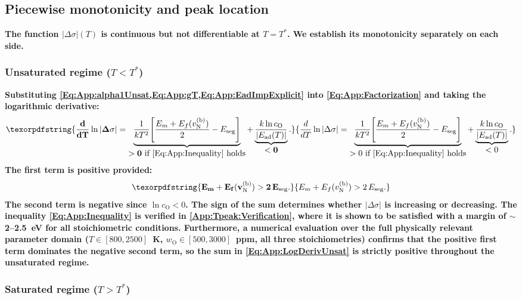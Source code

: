 \documentclass[preprint,12pt,sort&compress]{elsarticle}
\newcommand{\?}{\stackrel{?}{=}}
\providecommand{\DIFaddtex}[1]{{\bf #1}} %
\providecommand{\DIFadd}[1]{\texorpdfstring{\DIFaddtex{#1}}{#1}} %
\begin{document}
\subsection{\DIFadd{Piecewise monotonicity and peak location}}
\label{App:Tpeak:Monotonicity}

\DIFadd{The function $|\Delta \sigma|(T)$ is continuous but not differentiable at $T = T^*$. We establish its monotonicity separately on each side.
}

\subsubsection{\DIFadd{Unsaturated regime (}\texorpdfstring{$T < T^*$}{T < T*}\DIFadd{)}}

\DIFadd{Substituting \cref{Eq:App:alpha1Unsat,Eq:App:gT,Eq:App:EadImpExplicit} into \cref{Eq:App:Factorization} and taking the logarithmic derivative:
}\begin{equation}
\DIFadd{\frac{d}{dT}\ln|\Delta \sigma| = \underbrace{\frac{1}{kT^2}\!\left[\frac{E_m + E_f(v_\text{N}^{(\text{b})})}{2} - E_\text{seg}\right]}_{\displaystyle > 0 \text{ if \cref{Eq:App:Inequality} holds}} + \underbrace{\frac{k\ln c_\text{O}}{|E_\text{ad}(T)|}}_{\displaystyle < 0}.
\label{Eq:App:LogDerivUnsat}
}\end{equation}
\DIFadd{The first term is positive provided:
}\begin{equation}
\DIFadd{E_m + E_f(v_\text{N}^{(\text{b})}) > 2\,E_\text{seg}.
\label{Eq:App:Inequality}
}\end{equation}
\DIFadd{The second term is negative since $\ln c_\text{O} < 0$. The sign of the sum determines whether $|\Delta \sigma|$ is increasing or decreasing. The inequality \cref{Eq:App:Inequality} is verified in \ref{App:Tpeak:Verification}, where it is shown to be satisfied with a margin of $\sim$2--2.5~eV for all stoichiometric conditions. Furthermore, a numerical evaluation over the full physically relevant parameter domain ($T \in [800, 2500]$~K, $w_\text{O} \in [500, 3000]$~ppm, all three stoichiometries) confirms that the positive first term dominates the negative second term, so the sum in \cref{Eq:App:LogDerivUnsat} is strictly positive throughout the unsaturated regime.
}

\subsubsection{\DIFadd{Saturated regime (}\texorpdfstring{$T > T^*$}{T > T*}\DIFadd{)}}
\end{document}
